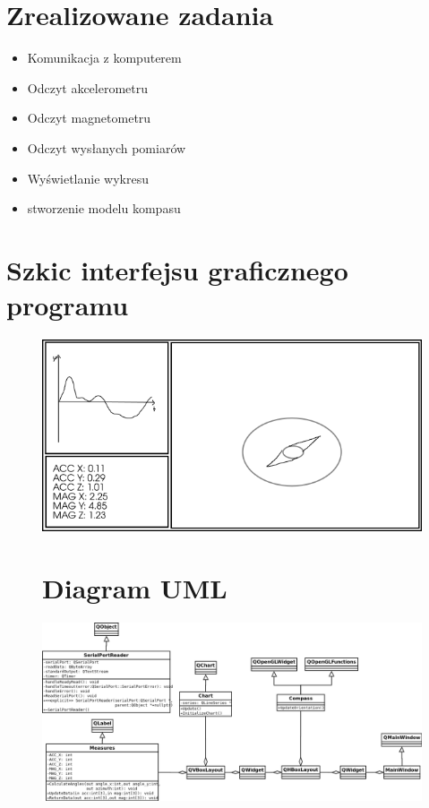\documentclass{article}
\begin{document}
\section{Zrealizowane zadania}
\begin{itemize}[noitemsep]
\item Komunikacja z komputerem
\item Odczyt akcelerometru
\item Odczyt magnetometru
\item Odczyt wysłanych pomiarów
\item Wyświetlanie wykresu
\item stworzenie modelu kompasu
\end{itemize}

\section{Szkic interfejsu graficznego programu}
\begin{figure}[H]
  \centering
  \includegraphics[width=0.75\linewidth]{layout.png}
\end{figure}

\begin{figure}[H]
\section{Diagram UML}
  \centering
  \includegraphics[width=0.75\linewidth]{Diagram1.png}
\end{figure}
\end{document}
